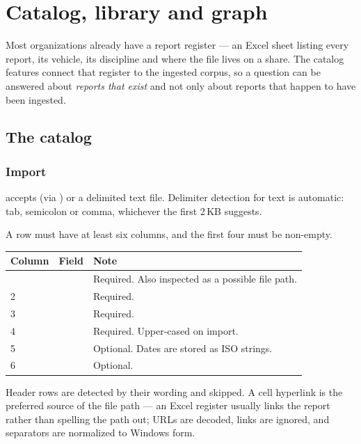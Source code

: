 \chapter{Catalog, library and graph}
\label{ch:catalog}

Most organizations already have a report register --- an Excel sheet listing
every report, its vehicle, its discipline and where the file lives on a share.
The catalog features connect that register to the ingested corpus, so a question
can be answered about \emph{reports that exist} and not only about reports that
happen to have been ingested.

\section{The catalog}

\subsection{Import}

 accepts  (via ) or a
delimited text file. Delimiter detection for text is automatic: tab, semicolon
or comma, whichever the first 2\,KB suggests.

A row must have at least six columns, and the first four must be non-empty.

\begin{longtable}{L{0.10\textwidth} L{0.22\textwidth} L{0.56\textwidth}}
\toprule
\textbf{Column} & \textbf{Field} & \textbf{Note} \\
\midrule
\endfirsthead
\bottomrule
{} &  & Required. Also inspected as a possible file path. \\
2 &  & Required. \\
3 &  & Required. \\
4 &  & Required. Upper-cased on import. \\
5 &  & Optional. Dates are stored as ISO strings. \\
6 &  & Optional. \\
\end{longtable}

Header rows are detected by their wording and skipped. A cell hyperlink is the
preferred source of the file path --- an Excel register usually links the report
rather than spelling the path out;  URLs are decoded,
 links are ignored, and separators are normalized to Windows form.

